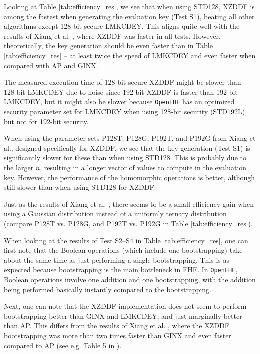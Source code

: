 Looking at Table \ref{tab:efficiency_res}, we see that when using STD128, XZDDF is among the fastest when generating the evaluation key (Test S1), beating all other algorithms except 128-bit secure LMKCDEY. This aligns quite well with the results of Xiang et al. \cite{cite:fast_bootstrap_crypto23}, where XZDDF was faster in all tests. However, theoretically, the key generation should be even faster than in Table \ref{tab:efficiency_res} -- at least twice the speed of LMKCDEY and even faster when compared with AP and GINX.

The measured execution time of 128-bit secure XZDDF might be slower than 128-bit LMKCDEY due to noise since 192-bit XZDDF is faster than 192-bit LMKCDEY, but it might also be slower because \texttt{OpenFHE} has an optimized security parameter set for LMKCDEY when using 128-bit security (STD192L), but not for 192-bit security.

When using the parameter sets P128T, P128G, P192T, and P192G from Xiang et al., designed specifically for XZDDF, we see that the key generation (Test S1) is significantly slower for these than when using STD128. This is probably due to the larger $n$, resulting in a longer vector of values to compute in the evaluation key. However, the performance of the homomorphic operations is better, although still slower than when using STD128 for XZDDF.

Just as the results of Xiang et al. \cite{cite:fast_bootstrap_crypto23}, there seems to be a small efficiency gain when using a Gaussian distribution instead of a uniformly ternary distribution (compare P128T vs. P128G, and P192T vs. P192G in Table \ref{tab:efficiency_res}).

When looking at the results of Test S2--S4 in Table \ref{tab:efficiency_res}, one can first note that the Boolean operations (which include one bootstrapping) take about the same time as just performing a single bootstrapping. This is as expected because bootstrapping is the main bottleneck in FHE. In \texttt{OpenFHE}, Boolean operations involve one addition and one bootstrapping, with the addition being performed basically instantly compared to the bootstrapping.

Next, one can note that the XZDDF implementation does not seem to perform bootstrapping better than GINX and LMKCDEY, and just marginally better than AP. This differs from the results of Xiang et al. \cite{cite:fast_bootstrap_crypto23}, where the XZDDF bootstrapping was more than two times faster than GINX and even faster compared to AP (see e.g. Table 5 in \cite{cite:fast_bootstrap_crypto23}).

